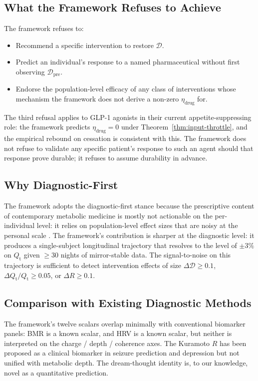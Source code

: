 \documentclass[11pt,twocolumn,a4paper]{article}
\theoremstyle{definition}
\theoremstyle{remark}
\newcommand{\Qt}{Q_{\mathrm{t}}}
\newcommand{\Dhier}{\mathcal{D}}
\newcommand{\etadrug}{\eta_{\mathrm{drug}}}
\newcommand{\Rcoh}{R}
\begin{document}
\subsection{What the Framework Refuses to Achieve}

The framework refuses to:
\begin{itemize}[leftmargin=*]
\item Recommend a specific intervention to restore $\Dhier$.
\item Predict an individual's response to a named pharmaceutical
without first observing $\Dhier_{\mathrm{pre}}$.
\item Endorse the population-level efficacy of any class of
interventions whose mechanism the framework does not derive a
non-zero $\etadrug$ for.
\end{itemize}

The third refusal applies to GLP-1 agonists in their current
appetite-suppressing role: the framework predicts $\etadrug = 0$
under Theorem~\ref{thm:input-throttle}, and the empirical rebound on
cessation \citep{wilding2022, davies2024, rubino2022} is consistent
with this. The framework does not refuse to validate any specific
patient's response to such an agent should that response prove
durable; it refuses to assume durability in advance.

\subsection{Why Diagnostic-First}

The framework adopts the diagnostic-first stance because the
prescriptive content of contemporary metabolic medicine is mostly
not actionable on the per-individual level: it relies on
population-level effect sizes that are noisy at the personal scale
\citep{davidson2018}. The framework's contribution is sharper at
the diagnostic level: it produces a single-subject longitudinal
trajectory that resolves to the level of $\pm 3\%$ on $\Qt$ given
$\geq 30$ nights of mirror-stable data. The signal-to-noise on this
trajectory is sufficient to detect intervention effects of size
$\Delta \Dhier \geq 0.1$, $\Delta \Qt / \Qt \geq 0.05$, or
$\Delta \Rcoh \geq 0.1$.

\subsection{Comparison with Existing Diagnostic Methods}

The framework's twelve scalars overlap minimally with conventional
biomarker panels: BMR is a known scalar, and HRV is a known scalar,
but neither is interpreted on the
charge / depth / coherence axes. The Kuramoto $\Rcoh$ has been
proposed as a clinical biomarker in seizure prediction
\citep{schiff2009} and depression \citep{glass2001} but not unified
with metabolic depth. The dream-thought identity is, to our
knowledge, novel as a quantitative prediction.
\end{document}
